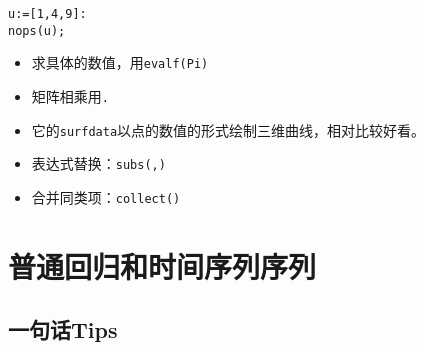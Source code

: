 \documentclass[
]{book}
\providecommand{\tightlist}{%
  \setlength{\itemsep}{0pt}\setlength{\parskip}{0pt}}
\begin{document}
\begin{verbatim}
u:=[1,4,9]:
nops(u);
\end{verbatim}

\begin{itemize}
\tightlist
\item
  求具体的数值，用\texttt{evalf(Pi)}
\item
  矩阵相乘用\texttt{.}
\item
  它的\texttt{surfdata}以点的数值的形式绘制三维曲线，相对比较好看。
\item
  表达式替换：\texttt{subs(,)}
\item
  合并同类项：\texttt{collect()}
\end{itemize}

\hypertarget{TS}{%
\chapter{普通回归和时间序列序列}\label{TS}}

\hypertarget{ux4e00ux53e5ux8bddtips-1}{%
\section{一句话Tips}\label{ux4e00ux53e5ux8bddtips-1}}
\end{document}
